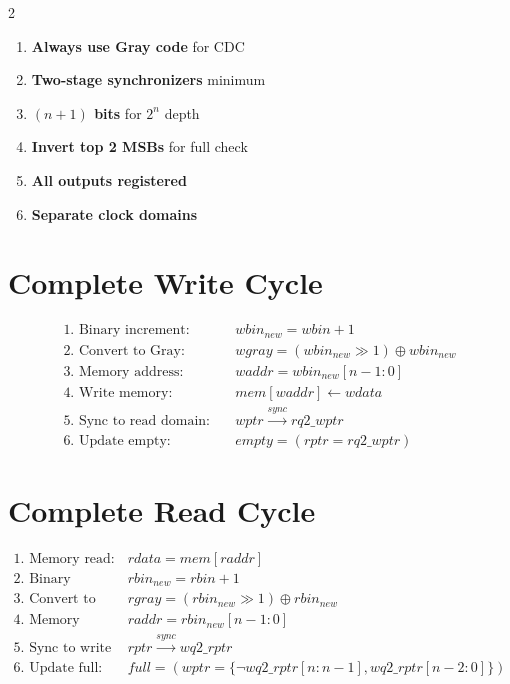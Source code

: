 \documentclass[10pt,landscape]{article}
\begin{document}
\begin{multicols}{2}
\begin{tcolorbox}[colback=yellow!10,colframe=black,title=\textbf{MUST Follow}]
\begin{enumerate}
    \item \textbf{Always use Gray code} for CDC
    \item \textbf{Two-stage synchronizers} minimum
    \item \textbf{$(n+1)$ bits} for $2^n$ depth
    \item \textbf{Invert top 2 MSBs} for full check
    \item \textbf{All outputs registered}
    \item \textbf{Separate clock domains}
\end{enumerate}
\end{tcolorbox}

\section*{Complete Write Cycle}

\begin{align*}
\text{1. Binary increment:} \quad & wbin_{new} = wbin + 1 \\
\text{2. Convert to Gray:} \quad & wgray = (wbin_{new} \gg 1) \oplus wbin_{new} \\
\text{3. Memory address:} \quad & waddr = wbin_{new}[n-1:0] \\
\text{4. Write memory:} \quad & mem[waddr] \leftarrow wdata \\
\text{5. Sync to read domain:} \quad & wptr \xrightarrow{sync} rq2\_wptr \\
\text{6. Update empty:} \quad & empty = (rptr = rq2\_wptr)
\end{align*}

\section*{Complete Read Cycle}

\begin{align*}
\text{1. Memory read:} \quad & rdata = mem[raddr] \\
\text{2. Binary increment:} \quad & rbin_{new} = rbin + 1 \\
\text{3. Convert to Gray:} \quad & rgray = (rbin_{new} \gg 1) \oplus rbin_{new} \\
\text{4. Memory address:} \quad & raddr = rbin_{new}[n-1:0] \\
\text{5. Sync to write domain:} \quad & rptr \xrightarrow{sync} wq2\_rptr \\
\text{6. Update full:} \quad & full = (wptr = \{\neg wq2\_rptr[n:n-1], wq2\_rptr[n-2:0]\})
\end{align*}


\end{multicols}
\end{document}

